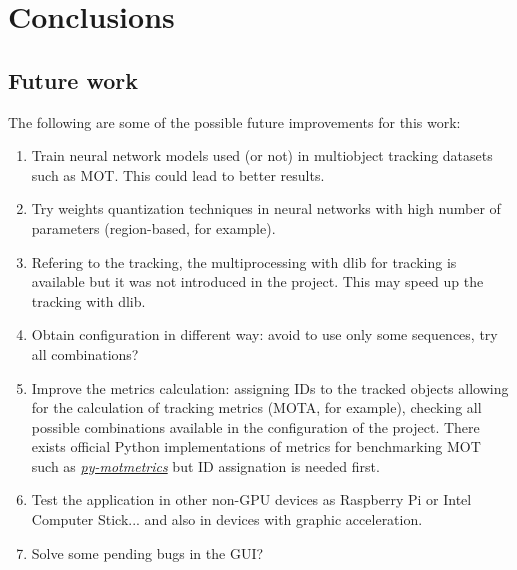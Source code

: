 \chapter{Conclusions}
\section{Future work}
The following are some of the possible future improvements for this work:
\begin{enumerate}
    \item Train neural network models used (or not) in multiobject tracking datasets such as MOT. This could lead to better results.
    \item Try weights quantization techniques in neural networks with high number of parameters (region-based, for example).
    \item Refering to the tracking, the multiprocessing with dlib for tracking is available but it was not introduced in the project. This may speed up the tracking with dlib.
    \item Obtain configuration in different way: avoid to use only some sequences, try all combinations?
    \item Improve the metrics calculation: assigning IDs to the tracked objects allowing for the calculation of tracking metrics (MOTA, for example), checking all possible combinations available in the configuration of the project. There exists official Python implementations of metrics for benchmarking MOT such as \href{https://github.com/cheind/py-motmetrics}{\textit{py-motmetrics}} but ID assignation is needed first.
    \item Test the application in other non-GPU devices as Raspberry Pi or Intel Computer Stick... and also in devices with graphic acceleration.
    \item Solve some pending bugs in the GUI?
\end{enumerate}